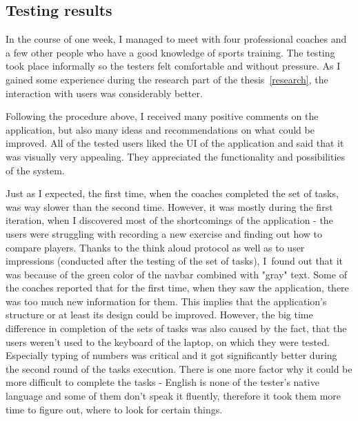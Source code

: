 \subsection{Testing results}
In the course of one week, I managed to meet with four professional coaches and a few other people who have a good knowledge of sports training. The testing took place informally so the testers felt comfortable and without pressure. As I gained some experience during the research part of the thesis~\ref{research}, the interaction with users was considerably better.

Following the procedure above, I received many positive comments on the application, but also many ideas and recommendations on what could be improved. All of the tested users liked the UI of the application and said that it was visually very appealing. They appreciated the functionality and possibilities of the system.

Just as I expected, the first time, when the coaches completed the set of tasks, was way slower than the second time. However, it was mostly during the first iteration, when I discovered most of the shortcomings of the application - the users were struggling with recording a new exercise and finding out how to compare players. Thanks to the think aloud protocol as well as to user impressions (conducted after the testing of the set of tasks), I~found out that it was because of the green color of the navbar combined with "gray" text. Some of the coaches reported that for the first time, when they saw the application, there was too much new information for them. This implies that the application’s structure or at least its design could be improved. However, the big time difference in completion of the sets of tasks was also caused by the fact, that the users weren’t used to the keyboard of the laptop, on which they were tested. Especially typing of numbers was critical and it got significantly better during the second round of the tasks execution. There is one more factor why it could be more difficult to complete the tasks - English is none of the tester’s native language and some of them don’t speak it fluently, therefore it took them more time to figure out, where to look for certain things.

